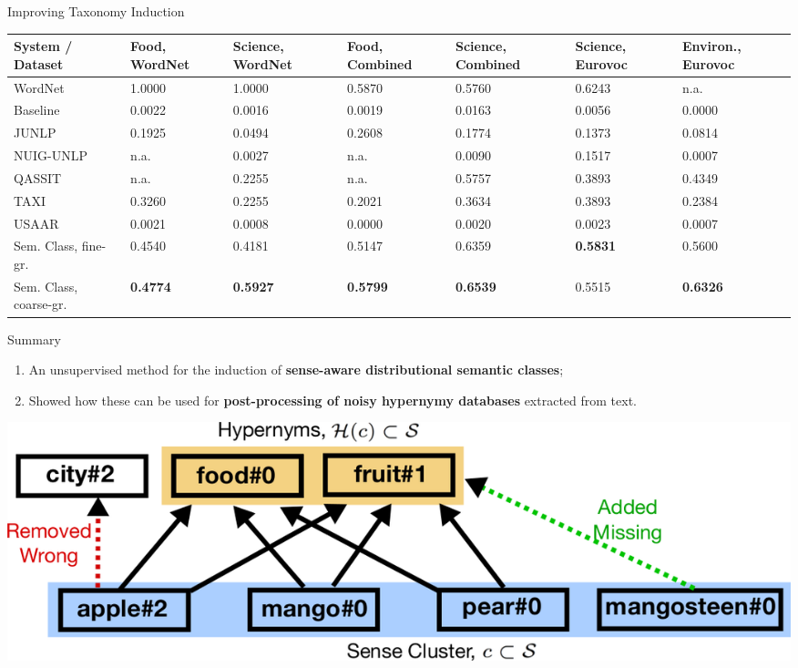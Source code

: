\documentclass[usenames,dvipsnames,notes]{beamer}
\begin{document}
\begin{frame}{ Improving Taxonomy Induction }


\begin{table}
\scriptsize
\centering
\begin{tabular}{p{2.6cm}|p{1cm}|p{1cm}|p{1cm}|p{1cm}|p{1cm}|p{1cm}}
\textbf{System / Dataset} & \textbf{Food, WordNet} & \textbf{Science, WordNet}& \textbf{Food, Combined} & \textbf{Science, Combined} & \textbf{Science, Eurovoc} & \textbf{Environ., Eurovoc} \\ \toprule

WordNet & 1.0000 & 1.0000 & 0.5870 & 0.5760 & 0.6243 & n.a. \\ \midrule

Baseline & 0.0022 & 0.0016 & 0.0019 & 0.0163 & 0.0056 & 0.0000 \\
JUNLP & 0.1925 & 0.0494 & 0.2608 & 0.1774 & 0.1373 & 0.0814 \\
NUIG-UNLP & n.a. & 0.0027 & n.a. & 0.0090 & 0.1517 & 0.0007 \\
QASSIT & n.a. & 0.2255 & n.a. & 0.5757 & 0.3893 & 0.4349 \\
TAXI & 0.3260 & 0.2255 & 0.2021 & 0.3634 & 0.3893 & 0.2384 \\
USAAR & 0.0021 & 0.0008 & 0.0000 & 0.0020 & 0.0023 & 0.0007 \\ \midrule

Sem. Class, fine-gr. & 0.4540 & 0.4181 & 0.5147 & 0.6359 &  \textbf{0.5831} & 0.5600 \\
Sem. Class, coarse-gr. & \textbf{0.4774} & \textbf{0.5927} & \textbf{0.5799} & \textbf{0.6539} & 0.5515 & \textbf{0.6326} 
\end{tabular}
\end{table}


\end{frame}



\begin{frame}{ Summary }

\begin{enumerate}
	\item An unsupervised method for the induction of \textbf{\alert{sense-aware distributional semantic classes}};
	\item Showed how these can be used for \textbf{\alert{post-processing of noisy hypernymy databases}} extracted from text.
\end{enumerate}


\begin{center}
\includegraphics[width=.9\textwidth]{figures/coset}
\end{center}

\end{frame}
\end{document}
